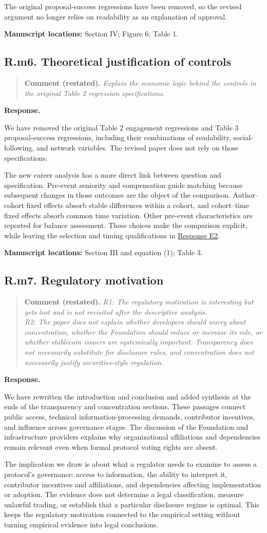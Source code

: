 \documentclass[11pt,letterpaper]{article}
\newcommand{\point}[3]{%
  \Needspace{7\baselineskip}
  \subsection*{#1. #2}\phantomsection\label{pt:#1}%
  \begin{quote}\small\textbf{Comment (restated).} \textit{#3}\end{quote}%
  \textbf{Response.}\enspace\ignorespaces}
\newcommand{\locations}[1]{\par{\small\textbf{Manuscript locations:} #1.}\par}
\newcommand{\replyref}[1]{\hyperref[pt:#1]{Response #1}}
\begin{document}
 The original proposal-success regressions have been removed, so the revised argument no longer relies on readability as an explanation of approval.

\locations{Section IV; Figure 6; Table 1}

\point{R.m6}{Theoretical justification of controls}{Explain the economic logic behind the controls in the original Table 2 regression specifications.}

We have removed the original Table 2 engagement regressions and Table 3 proposal-success regressions, including their combinations of readability, social-following, and network variables. The revised paper does not rely on those specifications.

The new career analysis has a more direct link between question and specification. Pre-event seniority and compensation guide matching because subsequent changes in those outcomes are the object of the comparison. Author--cohort fixed effects absorb stable differences within a cohort, and cohort--time fixed effects absorb common time variation. Other pre-event characteristics are reported for balance assessment. These choices make the comparison explicit, while leaving the selection and timing qualifications in \replyref{E2}.

\locations{Section III and equation (1); Table 3}

\point{R.m7}{Regulatory motivation}{R1: The regulatory motivation is interesting but gets lost and is not revisited after the descriptive analysis.\\
R2: The paper does not explain whether developers should worry about concentration, whether the Foundation should reduce or increase its role, or whether stablecoin issuers are systemically important. Transparency does not necessarily substitute for disclosure rules, and concentration does not necessarily justify securities-style regulation.}

We have rewritten the introduction and conclusion and added synthesis at the ends of the transparency and concentration sections. These passages connect public access, technical information-processing demands, contributor incentives, and influence across governance stages. The discussion of the Foundation and infrastructure providers explains why organizational affiliations and dependencies remain relevant even when formal protocol voting rights are absent.

The implication we draw is about what a regulator needs to examine to assess a protocol's governance: access to information, the ability to interpret it, contributor incentives and affiliations, and dependencies affecting implementation or adoption. The evidence does not determine a legal classification, measure unlawful trading, or establish that a particular disclosure regime is optimal. This keeps the regulatory motivation connected to the empirical setting without turning empirical evidence into legal conclusions.
\end{document}
